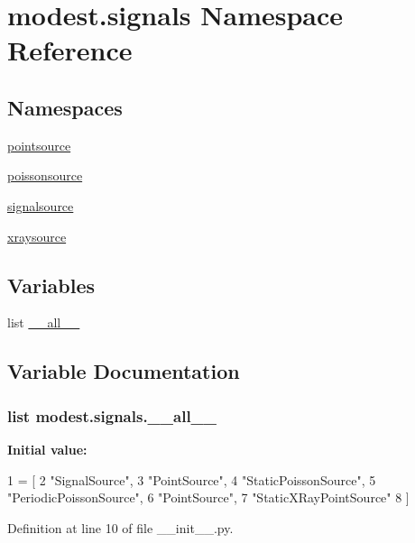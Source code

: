 \hypertarget{namespacemodest_1_1signals}{}\section{modest.\+signals Namespace Reference}
\label{namespacemodest_1_1signals}
\subsection*{Namespaces}
\begin{DoxyCompactItemize}
\item 
 \hyperlink{namespacemodest_1_1signals_1_1pointsource}{pointsource}
\item 
 \hyperlink{namespacemodest_1_1signals_1_1poissonsource}{poissonsource}
\item 
 \hyperlink{namespacemodest_1_1signals_1_1signalsource}{signalsource}
\item 
 \hyperlink{namespacemodest_1_1signals_1_1xraysource}{xraysource}
\end{DoxyCompactItemize}
\subsection*{Variables}
\begin{DoxyCompactItemize}
\item 
list \hyperlink{namespacemodest_1_1signals_aa31151680eba696b8f6eb7877a67adac}{\+\_\+\+\_\+all\+\_\+\+\_\+}
\end{DoxyCompactItemize}


\subsection{Variable Documentation}
\subsubsection[{\texorpdfstring{\+\_\+\+\_\+all\+\_\+\+\_\+}{__all__}}]{\setlength{\rightskip}{0pt plus 5cm}list modest.\+signals.\+\_\+\+\_\+all\+\_\+\+\_\+\hspace{0.3cm}{\ttfamily [private]}}\hypertarget{namespacemodest_1_1signals_aa31151680eba696b8f6eb7877a67adac}{}\label{namespacemodest_1_1signals_aa31151680eba696b8f6eb7877a67adac}
{\bfseries Initial value\+:}
\begin{DoxyCode}
1 = [
2     \textcolor{stringliteral}{"SignalSource"},
3     \textcolor{stringliteral}{"PointSource"},
4     \textcolor{stringliteral}{"StaticPoissonSource"},
5     \textcolor{stringliteral}{"PeriodicPoissonSource"},
6     \textcolor{stringliteral}{"PointSource"},
7     \textcolor{stringliteral}{"StaticXRayPointSource"}
8 ]
\end{DoxyCode}


Definition at line 10 of file \+\_\+\+\_\+init\+\_\+\+\_\+.\+py.

